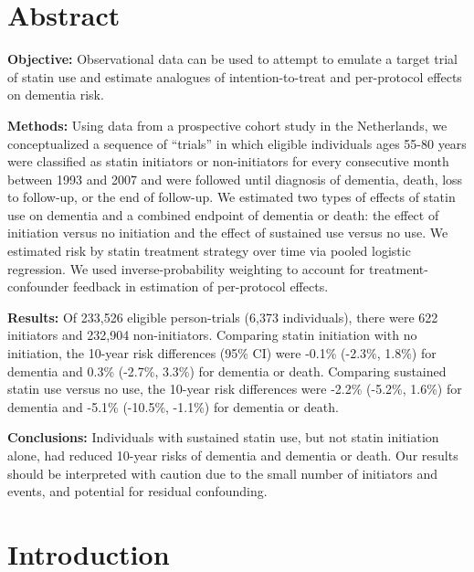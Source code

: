 \documentclass[
]{book}
\begin{document}
\newpage
\normalsize


\newpage

\hypertarget{abstract}{%
\section{Abstract}\label{abstract}}

\textbf{Objective:} Observational data can be used to attempt to emulate a target trial of statin use and estimate analogues of intention-to-treat and per-protocol effects on dementia risk.

\textbf{Methods:} Using data from a prospective cohort study in the Netherlands, we conceptualized a sequence of ``trials'' in which eligible individuals ages 55-80 years were classified as statin initiators or non-initiators for every consecutive month between 1993 and 2007 and were followed until diagnosis of dementia, death, loss to follow-up, or the end of follow-up. We estimated two types of effects of statin use on dementia and a combined endpoint of dementia or death: the effect of initiation versus no initiation and the effect of sustained use versus no use. We estimated risk by statin treatment strategy over time via pooled logistic regression. We used inverse-probability weighting to account for treatment-confounder feedback in estimation of per-protocol effects.

\textbf{Results:} Of 233,526 eligible person-trials (6,373 individuals), there were 622 initiators and 232,904 non-initiators. Comparing statin initiation with no initiation, the 10-year risk differences (95\% CI) were -0.1\% (-2.3\%, 1.8\%) for dementia and 0.3\% (-2.7\%, 3.3\%) for dementia or death. Comparing sustained statin use versus no use, the 10-year risk differences were -2.2\% (-5.2\%, 1.6\%) for dementia and -5.1\% (-10.5\%, -1.1\%) for dementia or death.

\textbf{Conclusions:} Individuals with sustained statin use, but not statin initiation alone, had reduced 10-year risks of dementia and dementia or death. Our results should be interpreted with caution due to the small number of initiators and events, and potential for residual confounding.

\newpage

\hypertarget{introduction}{%
\section{Introduction}\label{introduction}}
\end{document}
